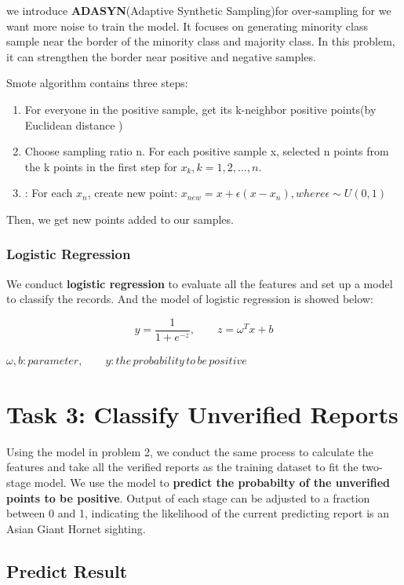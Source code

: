 \documentclass[12pt]{article}
\begin{document}
we introduce \textbf{ADASYN}(Adaptive Synthetic Sampling)for over-sampling for we want more noise to train the model. It focuses on generating minority class sample near the border of the minority class and majority class. In this problem, it can strengthen the border near positive and negative samples.


Smote algorithm contains three steps:
\begin{enumerate}
	\item For everyone in the positive sample, get its k-neighbor positive points(by Euclidean distance )
	\item Choose sampling ratio n. For each positive sample x, selected n points from the k points in the first step for $x_k,k=1,2,...,n$. 
	\item: For each $x_n$, create new point: $x_{new}=x+\epsilon(x-x_n), where \epsilon \sim U(0,1)$
\end{enumerate}

Then, we get new points added to our samples.

\subsubsection{Logistic Regression}
We conduct \textbf{logistic regression} to evaluate all the features and set up a model to classify the records. And the model of logistic regression is showed below:

\begin{equation}
y=\frac{1}{1+e^{-z}},\qquad z=\omega^Tx+b 
\end{equation}
\begin{center}
	$\omega,b:parameter,\qquad y:the\, probability\, to \,be\, positive$
\end{center}

\section{Task 3: Classify Unverified Reports}
Using the model in problem 2, we conduct the same process to calculate the features and take all the verified reports as the training dataset to fit the two-stage model. We use the model to \textbf{predict the probabilty of the unverified points to be positive}. Output of each stage can be adjusted to a fraction between 0 and 1, indicating the likelihood of the current predicting report is an Asian Giant Hornet sighting. 
\subsection{Predict Result}
\end{document}
